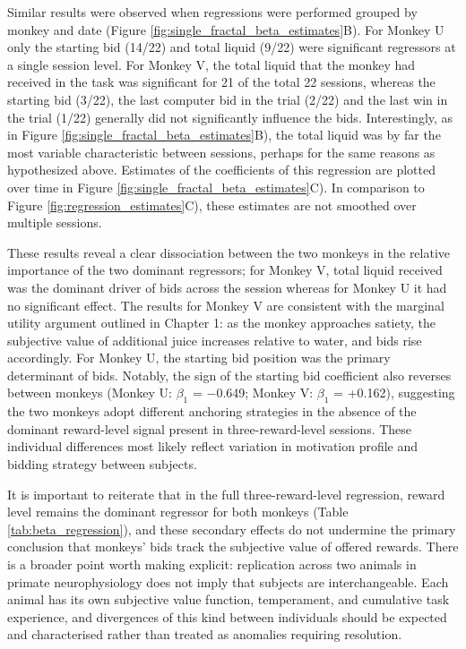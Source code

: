 Similar results were observed when regressions were performed grouped by monkey and date (Figure \ref{fig:single_fractal_beta_estimates}B). For Monkey U only the starting bid (14/22) and total liquid (9/22) were significant regressors at a single session level. For Monkey V, the total liquid that the monkey had received in the task was significant for 21 of the total 22 sessions, whereas the starting bid (3/22), the last computer bid in the trial (2/22) and the last win in the trial (1/22) generally did not significantly influence the bids. Interestingly, as in Figure \ref{fig:single_fractal_beta_estimates}B), the total liquid was by far the most variable characteristic between sessions, perhaps for the same reasons as hypothesized above. Estimates of the coefficients of this regression are plotted over time in Figure \ref{fig:single_fractal_beta_estimates}C). In comparison to Figure \ref{fig:regression_estimates}C), these estimates are not smoothed over multiple sessions.

These results reveal a clear dissociation between the two monkeys in the relative importance of the two dominant regressors; for Monkey V, total liquid received was the dominant driver of bids across the session whereas for Monkey U it had no significant effect. The results for Monkey V are consistent with the marginal utility argument outlined in Chapter 1: as the monkey approaches satiety, the subjective value of additional juice increases relative to water, and bids rise accordingly. For Monkey U, the starting bid position was the primary determinant of bids. Notably, the sign of the starting bid coefficient also reverses between monkeys (Monkey U: $\beta_1$ = $-$0.649; Monkey V: $\beta_1$ = +0.162), suggesting the two monkeys adopt different anchoring strategies in the absence of the dominant reward-level signal present in three-reward-level sessions. These individual differences most likely reflect variation in motivation profile and bidding strategy between subjects.

It is important to reiterate that in the full three-reward-level regression, reward level remains the dominant regressor for both monkeys (Table \ref{tab:beta_regression}), and these secondary effects do not undermine the primary conclusion that monkeys' bids track the subjective value of offered rewards. There is a broader point worth making explicit: replication across two animals in primate neurophysiology does not imply that subjects are interchangeable. Each animal has its own subjective value function, temperament, and cumulative task experience, and divergences of this kind between individuals should be expected and characterised rather than treated as anomalies requiring resolution.

